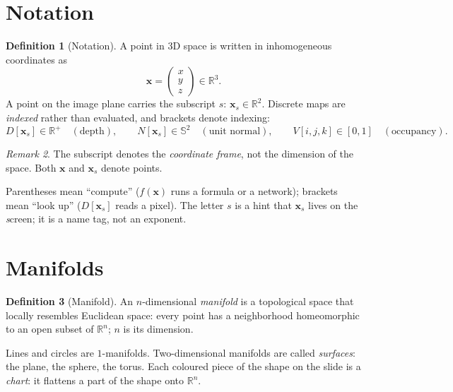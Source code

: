 \documentclass[11pt,a4paper]{article}
\newcommand{\R}{\mathbb{R}}
\newcommand{\Sph}{\mathbb{S}}
\newcommand{\vx}{\bm{x}}
\newcommand{\y}{\bm{y}}
\newcommand{\z}{\bm{z}}
\theoremstyle{definition}
\newtheorem{definition}{Definition}[section]
\theoremstyle{plain}
\theoremstyle{remark}
\newtheorem{remark}[definition]{Remark}
\begin{document}
\section{Notation }

\begin{definition}[Notation]
A point in 3D space is written in inhomogeneous coordinates as
\[
\vx=\begin{pmatrix}x\\y\\z\end{pmatrix}\in\R^3 .
\]
A point on the image plane carries the subscript $s$: $\vx_s\in\R^2$. Discrete maps are \emph{indexed} rather than evaluated, and brackets denote indexing:
\[
D[\vx_s]\in\R^+ \quad(\text{depth}),\qquad N[\vx_s]\in\Sph^2 \quad(\text{unit normal}),\qquad V[i,j,k]\in[0,1]\quad(\text{occupancy}).
\]
\end{definition}

\begin{remark}
The subscript denotes the \emph{coordinate frame}, not the dimension of the space. Both $\vx$ and $\vx_s$ denote points.
\end{remark}

\begin{intuition}
Parentheses mean ``compute'' ($f(\vx)$ runs a formula or a network); brackets mean ``look up'' ($D[\vx_s]$ reads a pixel). The letter $s$ is a hint that $\vx_s$ lives on the \emph{s}creen; it is a name tag, not an exponent.
\end{intuition}

\section{Manifolds }

\begin{definition}[Manifold]
An $n$-dimensional \emph{manifold} is a topological space that locally resembles Euclidean space: every point has a neighborhood homeomorphic to an open subset of $\R^n$; $n$ is its dimension.
\end{definition}

Lines and circles are $1$-manifolds. Two-dimensional manifolds are called \emph{surfaces}: the plane, the sphere, the torus. Each coloured piece of the shape on the slide is a \emph{chart}: it flattens a part of the shape onto $\R^n$.
\end{document}
